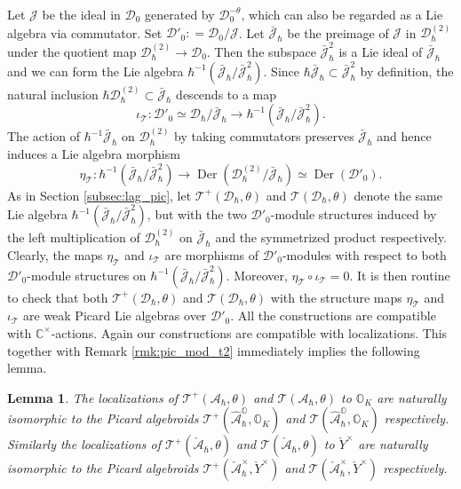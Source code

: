 \documentclass[12pt]{amsart}
\newcommand{\C}{\mathbb{C}}
\newcommand{\A}{\mathcal{A}}
\newcommand{\J}{\mathcal{J}}
\newcommand{\Orb}{\mathbb{O}}
\newcommand{\T}{\mathcal{T}}
\newcommand{\TT}{\mathscr{T}}
\newcommand{\cm}{\C^\times}
\newcommand{\Dcal}{\mathcal{D}}
\newcommand{\der}{{\operatorname{Der}}}
\newtheorem{Lem}[Thm]{Lemma}
\theoremstyle{definition}
\numberwithin{equation}{section}
\begin{document}
 Let $\J$ be the ideal in $\Dcal_0$ generated by $\Dcal_0^{-\theta} $, which can also be regarded as a Lie algebra via commutator. Set $\Dcal'_0: = \Dcal_0 / \J$. Let $\bar{\J}_\hbar$ be the preimage of $\J$ in $\Dcal_\hbar^{(2)}$ under the quotient map $\Dcal_\hbar^{(2)} \to \Dcal_0$. Then the subspace $\bar{\J}_\hbar^2$ is a Lie ideal of $ \bar{\J}_\hbar$ and we can form the Lie algebra $\hbar^{-1} (\bar{\J}_\hbar / \bar{\J}_\hbar^2)$. Since $\hbar \bar{\J}_\hbar \subset \bar{\J}_\hbar^2$ by definition, the natural inclusion $\hbar \Dcal_\hbar^{(2)}  \subset  \bar{\J}_\hbar$ descends to a map
   \[  \iota_\T: \Dcal'_0 \simeq \Dcal_\hbar / \bar{\J}_\hbar \to \hbar^{-1} (\bar{\J}_\hbar / \bar{\J}_\hbar^2). \]
The action of $\hbar^{-1} \bar{\J}_\hbar$ on $\Dcal_\hbar^{(2)}$ by taking commutators preserves $\bar{\J}_\hbar$ and hence induces a Lie algebra morphism
   \[ \eta_\T: \hbar^{-1} (\bar{\J}_\hbar / \bar{\J}_\hbar^2) \to \der(\Dcal_\hbar^{(2)} / \bar{\J}_\hbar) \simeq \der(\Dcal'_0). \]
 As in Section \ref{subsec:lag_pic}, let $\T^+(\Dcal_\hbar, \theta)$ and $\T(\Dcal_\hbar, \theta)$ denote the same Lie algebra $\hbar^{-1} (\bar{\J}_\hbar / \bar{\J}_\hbar^2)$, but with the two $\Dcal'_0$-module structures induced by the left multiplication of $\Dcal_\hbar^{(2)}$ on $\bar{\J}_\hbar$ and the symmetrized product respectively. Clearly, the  maps $\eta_\T$ and $\iota_\T$ are morphisms of $\Dcal'_0$-modules with respect to both $\Dcal'_0$-module structures on $\hbar^{-1} (\bar{\J}_\hbar / \bar{\J}_\hbar^2)$. Moreover, $\eta_\T \circ \iota_\T = 0$. It is then routine to check that both $\T^+(\Dcal_\hbar, \theta)$ and $\T(\Dcal_\hbar, \theta)$ with the structure maps  $\eta_\T$ and $\iota_\T$ are weak Picard Lie algebras over $\Dcal'_0$. All the constructions are compatible with $\cm$-actions. Again our constructions are compatible with localizations. This together with Remark \ref{rmk:pic_mod_t2} immediately implies the following lemma.

 \begin{Lem}\label{lem:Picard_loc}
 	The localizations of $\T^+( \A_\hbar, \theta)$ and $\T( \A_\hbar, \theta)$ to $\Orb_K$ are naturally isomorphic to the Picard algebroids $\TT^+(\hat{\A}_\hbar^\Orb, \Orb_K)$ and $\TT(\hat{\A}_\hbar^\Orb, \Orb_K)$ respectively. Similarly the localizations of $\T^+( \check{\A}_\hbar, \theta)$ and $\T( \check{\A}_\hbar, \theta)$ to $\check{Y}^\times$ are naturally isomorphic to the Picard algebroids $\TT^+(\check{\A}_\hbar^\times, \check{Y}^\times)$ and $\TT(\check{\A}_\hbar^\times, \check{Y}^\times)$ respectively.
 \end{Lem}
\end{document}
